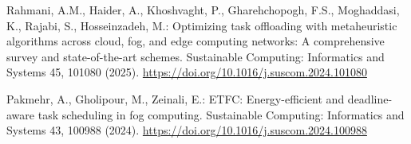 \documentclass{svproc}
\begin{document}
\begin{thebibliography}{99}
Rahmani, A.M., Haider, A., Khoshvaght, P., Gharehchopogh, F.S., Moghaddasi, K., Rajabi, S., Hosseinzadeh, M.: Optimizing task offloading with metaheuristic algorithms across cloud, fog, and edge computing networks: A comprehensive survey and state-of-the-art schemes. Sustainable Computing: Informatics and Systems 45, 101080 (2025). \url{https://doi.org/10.1016/j.suscom.2024.101080}

Pakmehr, A., Gholipour, M., Zeinali, E.: ETFC: Energy-efficient and deadline-aware task scheduling in fog computing. Sustainable Computing: Informatics and Systems 43, 100988 (2024). \url{https://doi.org/10.1016/j.suscom.2024.100988}

\end{thebibliography}
\end{document}
